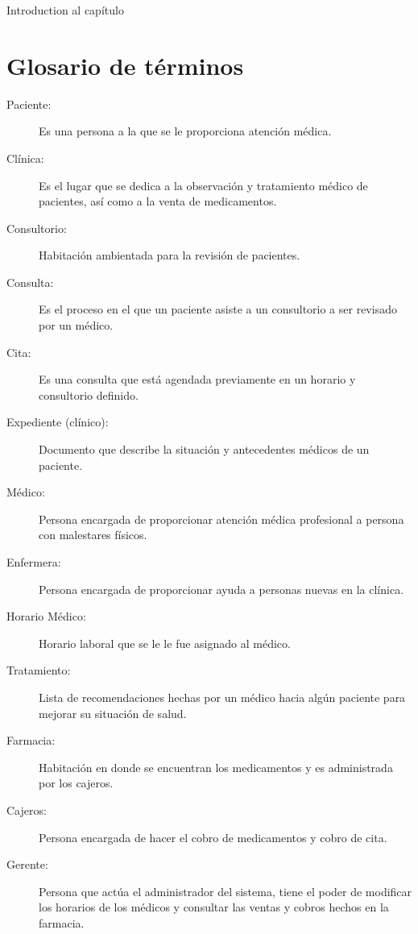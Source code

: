 Introduction al capítulo

\section{Glosario de términos}
\begin{description}
\item [Paciente:] Es una persona a la que se le proporciona atención médica. 
\item [Clínica:] Es el lugar que se dedica a la observación y tratamiento médico de pacientes, así como a la venta de medicamentos.
\item [Consultorio:] Habitación ambientada para la revisión de pacientes.
\item [Consulta:] Es el proceso en el que un paciente asiste a un consultorio a ser revisado por un médico. 
\item [Cita:] Es una consulta que está agendada previamente en un horario y consultorio definido.
\item [Expediente (clínico):] Documento que describe la situación y antecedentes médicos de un paciente.
\item [Médico:] Persona encargada de proporcionar atención médica profesional a persona con malestares físicos.
\item [Enfermera:] Persona encargada de proporcionar ayuda a personas nuevas en la clínica. 
\item [Horario Médico:] Horario laboral que se le le fue asignado al médico.
\item [Tratamiento:] Lista de recomendaciones hechas por un médico hacia algún paciente para mejorar su situación de salud.
\item [Farmacia:] Habitación en donde se encuentran los medicamentos y es administrada por los cajeros.
\item [Cajeros:] Persona encargada de hacer el cobro de medicamentos y cobro de cita.
\item [Gerente:] Persona que actúa el administrador del sistema, tiene el poder de modificar los horarios de los médicos y consultar las ventas y cobros hechos en la farmacia.
\end{description}


